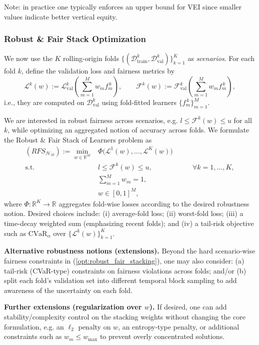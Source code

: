 \documentclass[11pt]{article}
\theoremstyle{plain}
\theoremstyle{definition}
\newcommand{\R}{\mathbb{R}}
\newcommand{\1}{\mathbf{1}}
\newcommand{\D}{\mathcal{D}}
\newcommand{\F}{\mathcal{F}}
\renewcommand{\L}{\mathcal{L}}
\renewcommand{\H}{\mathcal{H}}
\renewcommand{\R}{\mathbb{R}}
\begin{document}
{\noindent Note: in practice one typically enforces an upper bound for VEI since smaller values indicate better vertical equity.

\subsubsection{Robust \& Fair Stack Optimization}

We now use the $K$ rolling-origin folds $\{(\D^k_{\mathrm{train}},\D^k_{\mathrm{val}})\}_{k=1}^K$ as \emph{scenarios}. For each fold $k$, define the validation loss and fairness metrics by
\[
\L^{k}(w):=\L_{\mathrm{val}}^{k}\!\left(\sum_{m=1}^M w_m f_m^{\,k}\right),
\qquad
\F^{k}(w):=\F_{\mathrm{val}}^{k}\!\left(\sum_{m=1}^M w_m f_m^{\,k}\right),
\]
i.e., they are computed on $\D^k_{\mathrm{val}}$ using fold-fitted learners $\{f_m^{\,k}\}_{m=1}^M$.

We are interested in robust fairness across scenarios, e.g. $l\le \F^k(w)\le u$ for all $k$, while optimizing an aggregated notion of accuracy across folds. We formulate the Robust \& Fair Stack of Learners problem as
{\everymath{\displaystyle}
\begin{equation}
\label{opt:robust_fair_stacking}
\begin{array}{rcl}
(RFS_{\H_M}):= \min\limits_{w\in\R^M} &
\Phi\!\Big(\L^{1}(w),\ldots,\L^{K}(w)\Big)\\
\text{s.t.} & l \le \F^{k}(w)\le u, &\qquad \forall k=1,\ldots,K,\\
& \sum_{m=1}^M w_m=1,\\
& w\in[0,1]^M,
\end{array}
\end{equation}
}
\hspace{-3.3mm} where $\Phi:\R^{K}\to\R$ aggregates fold-wise losses according to the desired robustness notion. Desired choices include:
(i) average-fold loss; (ii) worst-fold loss; (iii) a time-decay weighted sum (emphasizing recent folds); and (iv) a tail-risk objective such as $\mathrm{CVaR}_\alpha$ over $\{\L^k(w)\}_{k=1}^K$.

\medskip
\noindent \textbf{Alternative robustness notions (extensions).}
Beyond the hard scenario-wise fairness constraints in (\ref{opt:robust_fair_stacking}), one may also consider: (a) tail-risk (CVaR-type) constraints on fairness violations across folds; and/or (b) split each fold's validation set into different temporal block sampling to add awareness of the uncertainty on each fold.

\medskip
\noindent \textbf{Further extensions (regularization over $w$).}
If desired, one can add stability/complexity control on the stacking weights without changing the core formulation, e.g. an $\ell_2$ penalty on $w$, an entropy-type penalty, or additional constraints such as $w_m\le w_{\max}$ to prevent overly concentrated solutions.

}
\end{document}
